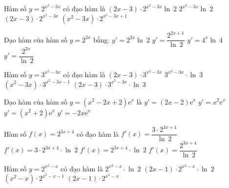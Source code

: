 \begin{ex}%
	Hàm số  $y=2^{x^{2}-3x}$ có đạo hàm là
	 \choice
		{\True  $(2x-3) \cdot 2^{x^{2}-3x}\ln~2$}
		{$2^{x^{2}-3x}\ln~2$} 
		{$(2x-3) \cdot  2^{x^{2}-3x}$}
		{$(x^{2}-3x) \cdot 2^{x^{2}-3x+1}$} 
\end{ex}

\begin{ex}%
	Đạo hàm  của hàm số $y=2^{2x}$ bằng.
	 \choice
		{$y'=2^{2x}\ln~2$} 
		{$y'=\dfrac{2^{2x+1}}{\ln~2}$} 
		 {\True $y'=4^{x}\ln~4$}
		{$y'=\dfrac{2^{2x}}{\ln~2}$} 
\end{ex}

\begin{ex}%
	Hàm số  $y=3^{x^{2}-3x}$ có đạo hàm là
	 \choice
		{$(2x-3) \cdot 3^{x^{2}-3x}$} 
		{$3^{x^{2}-3x} \cdot \ln~3$} 
		 {$(x^{2}-3x) \cdot 3^{x^{2}-3x-1}$}
		{\True $(2x-3) \cdot 3^{x^{2}-3x}  \cdot \ln~3$}
\end{ex}

\begin{ex}%
	Đạo hàm của hàm số $y=\left(x^2-2x+2\right)\mathrm{e}^x$  là
	 \choice
		 {$y'=\left(2x-2\right)\mathrm{e}^x$}
		{\True $y'=x^2\mathrm{e}^x$} 
		 {$y'=\left(x^2+2\right)\mathrm{e}^x$}
		 {$y'=-2x\mathrm{e}^x$}
\end{ex}

\begin{ex}%
	Hàm  số $f(x)=2^{3x+4}$ có đạo hàm là
	 \choice
		{$f'(x)=\dfrac{3  \cdot 2^{3x+4}}{\ln~2}$}
		{\True $f'(x)=3 \cdot 2^{3x+4}  \cdot \ln~2$}
		{$f'(x)=2^{3x+4} \cdot \ln~2$} 
		 {$f'(x)=\dfrac{2^{3x+4}}{\ln~2}$}
\end{ex}

\begin{ex}%
	Hàm số $y=2^{x^{2}-x}$ có  đạo hàm là
	\choice 
		 {$2^{x^{2}-x} \cdot \ln~2$}
		 {\True $(2x-1) \cdot 2^{x^{2}-x} \cdot \ln~2$}
		{$(x^{2}-x)  \cdot 2^{x^{2}-x-1}$}
		 {$(2x-1) \cdot 2^{x^{2}-x}$}
\end{ex}

